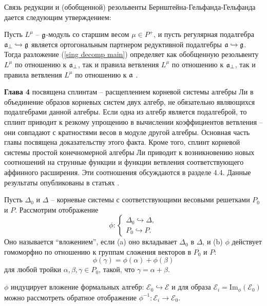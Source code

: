 \documentclass[14pt,autoref,href,facsimile
]{disser}
\begin{document}
Связь редукции и (обобщенной) резольвенты Бернштейна-Гельфанда-Гельфанда дается следующим утверждением:
\begin{statement}
Пусть $L^{\mu }$ --  $\frak{g}$-модуль со старшим весом $\mu \in P^{+}$, и пусть регулярная подалгебра  $\mathfrak{a}_{\perp}\hookrightarrow \frak{g}$ является ортогональным партнером редуктивной подалгебры $\frak{a}\hookrightarrow \frak{g}$. Тогда разложение (\ref{sing decomp main}) определяет как обобщенную резольвенту $L^{\mu }$ по отношению к $\mathfrak{a}_{\perp}$, так и правила ветвления $L^{\mu }$ по отношению к $\mathfrak{a}_{\perp}$, так и правила ветвления $L^{\mu }$ по отношению к $\mathfrak{a}$ .
\end{statement}

\textbf{Глава 4} посвящена сплинтам -- расщеплением корневой системы алгебры Ли в объединение образов корневых систем двух алгебр, не обязательно являющихся подалгебрами данной алгебры. Если одна из алгебр является подалгеброй, то сплинт приводит к резкому упрощению в вычислении коэффициентов ветвления -- они совпадают с кратностями весов в модуле другой алгебры. Основная часть главы посвящена доказательству этого факта. Кроме того, сплинт корневой системы простой конечномерной алгебры Ли приводит к возникновению новых соотношений на струнные функции и функции ветвления соответствующего аффинного расширения. Эти соотношения обсуждаются в разделе 4.4.
Данные результаты опубликованы в статьях .


\begin{definition}
Пусть $\Delta _{0}$ и $\Delta$ -- корневые системы с соответствующими весовыми решетками $P_{0}$ и $P$. Рассмотрим отображение
\begin{equation}
\phi :\left\{
\begin{array}{l}
\Delta _{0}\hookrightarrow \Delta , \\
P_{0}\hookrightarrow P.
\end{array}
\right.
\end{equation}
Оно называется ``вложением'', если \newline
\noindent (a) оно вкладывает $\Delta _{0}$ в $\Delta $, и \newline
\noindent (b) $\phi$ действует гомоморфно по отношению к группам сложения векторов в $P_{0}$ и $P$:
\[
\phi (\gamma )=\phi (\alpha )+\phi (\beta )
\]
для любой тройки $\alpha ,\beta ,\gamma \in P_{0}$, такой, что $\gamma =\alpha+\beta $.
\end{definition}

$\phi$ индуцирует вложение формальных алгебр: ${\mathcal{E}}_0\hookrightarrow \mathcal{E}$ и для образа ${\mathcal{E}}_i=\mathrm{Im}_{\phi}\left( {\mathcal{E}}_0\right)$ можно рассмотреть обратное отображение $\phi^{-1}:{\mathcal{E}}_i \longrightarrow {\mathcal{E}}_0$.
\end{document}
